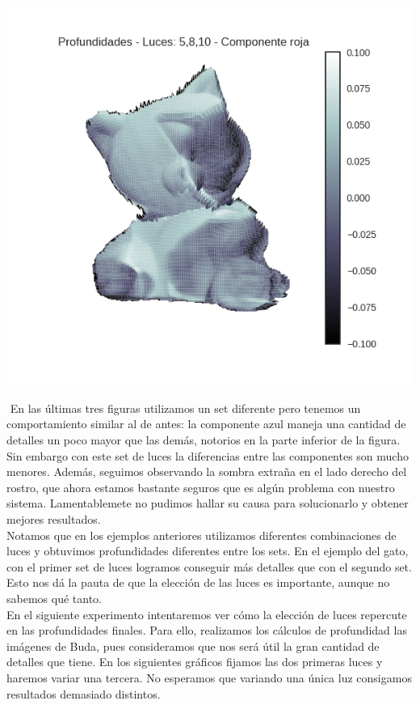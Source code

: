 {\centering
  \includegraphics[width=0.5\linewidth]{informe/imagenes/profundidades/gato5810Rojo.png}
}

$ $\newline
En las últimas tres figuras utilizamos un set diferente pero tenemos un comportamiento similar al de antes: la componente azul maneja una cantidad de detalles un poco mayor que las demás, notorios en la parte inferior de la figura. Sin embargo con este set de luces la diferencias entre las componentes son mucho menores. Además, seguimos observando la sombra extraña en el lado derecho del rostro, que ahora estamos bastante seguros que es algún problema con nuestro sistema. Lamentablemete no pudimos hallar su causa para solucionarlo y obtener mejores resultados. \\

Notamos que en los ejemplos anteriores utilizamos diferentes combinaciones de luces y obtuvimos profundidades diferentes entre los sets. En el ejemplo del gato, con el primer set de luces logramos conseguir más detalles que con el segundo set. Esto nos dá la pauta de que la elección de las luces es importante, aunque no sabemos qué tanto. \\

En el siguiente experimento intentaremos ver cómo la elección de luces repercute en las profundidades finales. Para ello, realizamos los cálculos de profundidad las imágenes de Buda, pues consideramos que nos será útil la gran cantidad de detalles que tiene. En los siguientes gráficos fijamos las dos primeras luces y haremos variar una tercera. No esperamos que variando una única luz consigamos resultados demasiado distintos. \\


